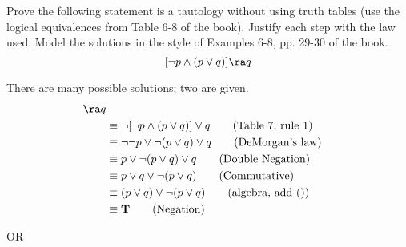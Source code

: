 \begin{questions}



 Prove the following statement is a tautology without using truth tables (use the logical equivalences from Table 6-8 of the book).  Justify each step with the law used.  Model the solutions in the style of Examples 6-8, pp. 29-30 of the book.
\[ [ \neg p \wedge (p \vee q) ] \ra q \]
    \ifprintanswers
        \vspace{-30pt}
    \fi
\begin{solution}  There are many possible solutions; two are given.
\small
    \begin{align*}
        [ \neg p & \wedge (p \vee q) ] \ra q \\
        & \equiv \neg [ \neg p \wedge (p \vee q) ] \vee q \tag{Table 7, rule 1} \\
        & \equiv \neg \neg p \vee \neg (p \vee q) \vee q \tag{DeMorgan's law} \\
        & \equiv p \vee \neg (p \vee q) \vee q \tag{Double Negation} \\
        & \equiv p \vee q \vee \neg (p \vee q) \tag{Commutative} \\
        & \equiv (p \vee q) \vee \neg (p \vee q) \tag{algebra, add ()} \\
        & \equiv \mathbf{T} \tag{Negation} 
    \end{align*}

    \begin{center}
    OR
    \end{center}


\end{solution}
\end{questions}
